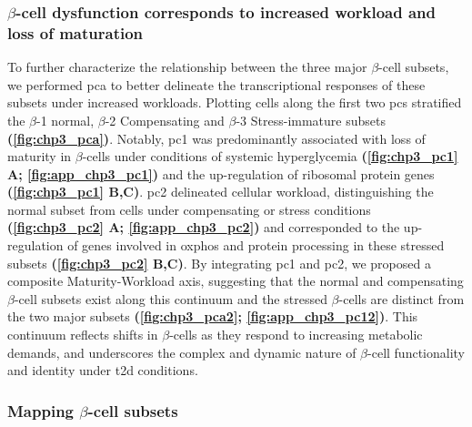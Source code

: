 \subsubsection{$\beta$-cell dysfunction corresponds to increased workload and loss of maturation}

\par To further characterize the relationship between the three major $\beta$-cell subsets, we performed \acrfull{pca} to better delineate the transcriptional responses of these subsets under increased workloads. Plotting cells along the first two \glspl{pc} stratified the $\beta$-1 normal, $\beta$-2 Compensating and $\beta$-3 Stress-immature subsets \textbf{(\autoref{fig:chp3_pca})}. Notably, \gls{pc}1 was predominantly associated with loss of maturity in $\beta$-cells under conditions of systemic hyperglycemia \textbf{(\autoref{fig:chp3_pc1} A; \autoref{fig:app_chp3_pc1})} and the up-regulation of ribosomal protein genes \textbf{(\autoref{fig:chp3_pc1} B,C)}. \gls{pc}2 delineated cellular workload, distinguishing the normal subset from cells under compensating or stress conditions \textbf{(\autoref{fig:chp3_pc2} A; \autoref{fig:app_chp3_pc2})} and corresponded to the up-regulation of genes involved in \gls{oxphos} and protein processing in these stressed subsets \textbf{(\autoref{fig:chp3_pc2} B,C)}. By integrating \gls{pc}1 and \gls{pc}2, we proposed a composite Maturity-Workload axis, suggesting that the normal and compensating $\beta$-cell subsets exist along this continuum and the stressed $\beta$-cells are distinct from the two major subsets \textbf{(\autoref{fig:chp3_pca2}; \autoref{fig:app_chp3_pc12})}. This continuum reflects shifts in $\beta$-cells as they respond to increasing metabolic demands, and underscores the complex and dynamic nature of $\beta$-cell functionality and identity under \gls{t2d} conditions.

\subsubsection{Mapping $\beta$-cell subsets}

